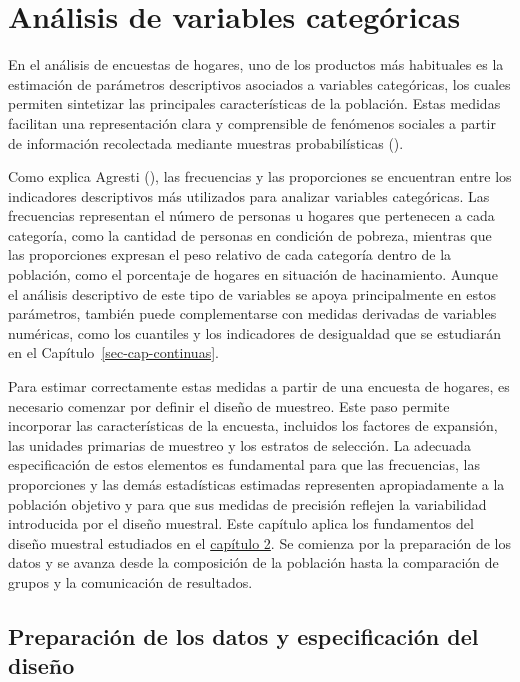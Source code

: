 \documentclass[
  spanish,
  11pt,
  letterpaper,
  oneside,
  open=any]{scrbook}
\begin{document}

\chapter{Análisis de variables categóricas}\label{sec-cap-categoricas}

En el análisis de encuestas de hogares, uno de los productos más
habituales es la estimación de parámetros descriptivos asociados a
variables categóricas, los cuales permiten sintetizar las principales
características de la población. Estas medidas facilitan una
representación clara y comprensible de fenómenos sociales a partir de
información recolectada mediante muestras probabilísticas
().

Como explica Agresti (), las
frecuencias y las proporciones se encuentran entre los indicadores
descriptivos más utilizados para analizar variables categóricas. Las
frecuencias representan el número de personas u hogares que pertenecen a
cada categoría, como la cantidad de personas en condición de pobreza,
mientras que las proporciones expresan el peso relativo de cada
categoría dentro de la población, como el porcentaje de hogares en
situación de hacinamiento. Aunque el análisis descriptivo de este tipo
de variables se apoya principalmente en estos parámetros, también puede
complementarse con medidas derivadas de variables numéricas, como los
cuantiles y los indicadores de desigualdad que se estudiarán en el
Capítulo~\ref{sec-cap-continuas}.

Para estimar correctamente estas medidas a partir de una encuesta de
hogares, es necesario comenzar por definir el diseño de muestreo. Este
paso permite incorporar las características de la encuesta, incluidos
los factores de expansión, las unidades primarias de muestreo y los
estratos de selección. La adecuada especificación de estos elementos es
fundamental para que las frecuencias, las proporciones y las demás
estadísticas estimadas representen apropiadamente a la población
objetivo y para que sus medidas de precisión reflejen la variabilidad
introducida por el diseño muestral. Este capítulo aplica los fundamentos
del diseño muestral estudiados en el \hyperref[cap2]{capítulo 2}. Se
comienza por la preparación de los datos y se avanza desde la
composición de la población hasta la comparación de grupos y la
comunicación de resultados.

\section{Preparación de los datos y especificación del
diseño}\label{sec-preparacion-categoricas}
\end{document}
